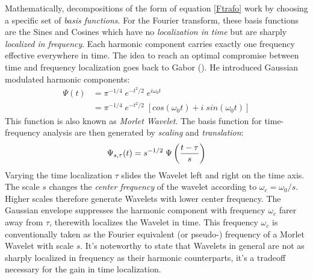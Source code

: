 Mathematically, decompositions of the form of equation \ref{Ftrafo} work by choosing a specific set of \textit{basis functions}. For the Fourier transform, these basis functions are the Sines and Cosines which have no \textit{localization in time} but are sharply \textit{localized in frequency}. Each harmonic component carries exactly one frequency effective everywhere in time. The idea to reach an optimal compromise between time and frequency localization goes back to Gabor (\cite{Gabor1946}). He introduced Gaussian modulated harmonic components:
\begin{align}
  \Psi(t) &= \pi^{-1/4} \; e^{-t^2/2} \; e^{i\omega_0 t}\\
  &= \pi^{-1/4} \; e^{-t^2/2} \; \left[cos(\omega_0 t) + i\; sin(\omega_0 t) \right]
\end{align}
This function is also known as \textit{Morlet Wavelet}. The basis function for time-frequency analysis are then generated by \textit{scaling} and \textit{translation}:
\begin{equation}
  \Psi_{s,\tau}(t) = s^{-1/2}\;\Psi \left(\frac{t - \tau}{s}\right)
\end{equation}
Varying the time localization $\tau$ slides the Wavelet left and right on the time axis. The scale $s$ changes the \textit{center frequency} of the wavelet according to $\omega_c = \omega_0/s$. Higher scales therefore generate Wavelets with lower center frequency. The Gaussian envelope suppresses the harmonic component with frequency $\omega_c$ farer away from $\tau$, therewith localizes the Wavelet in time. This frequency $\omega_c$ is conventionally taken as the Fourier equivalent (or pseudo-) frequency of a Morlet Wavelet with scale $s$. It's noteworthy to state that Wavelets in general are not as sharply localized in frequency as their harmonic counterparts, it's a tradeoff necessary for the gain in time localization. 

